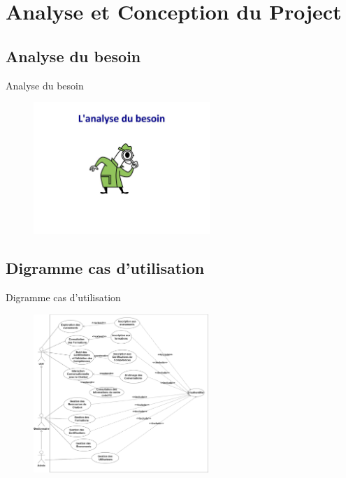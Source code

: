\documentclass[aspectratio=169]{beamer}
\begin{document}
\section{Analyse et Conception du Project}
\subsection{Analyse du besoin}
\begin{frame}{Analyse du besoin}
    \begin{figure}[htpb]
        \centering
        \includegraphics[height=5cm]{pic/analyse-besoin.jpg}
    \end{figure}

\end{frame}

\subsection{Digramme cas d'utilisation}
\begin{frame}{Digramme cas d'utilisation}
    \begin{figure}[htpb]
        \centering
        \includegraphics[height=6cm]{pic/usecase.png}
    \end{figure}
\end{frame}
\end{document}
